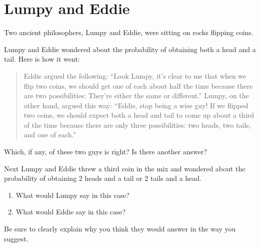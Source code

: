 \newpage
\section{Lumpy and Eddie}

Two ancient philosophers, Lumpy and Eddie, were sitting on rocks
flipping coins. 

\begin{prob} Lumpy and Eddie wondered about the probability of obtaining both a head and a tail. Here is how it went:
\begin{quote}
Eddie argued the following: ``Look Lumpy, it's clear to me that when
we flip two coins, we should get one of each about half the time
because there are two possibilities: They're either the same or
different.'' Lumpy, on the other hand, argued this way: ``Eddie, stop
being a wise guy! If we flipped two coins, we should expect both a
head and tail to come up about a third of the time because there are
only three possibilities: two heads, two tails, and one of each.''
\end{quote}
Which, if any, of these two guys is right?  Is there another answer?
\end{prob}

\begin{prob}
Next Lumpy and Eddie threw a third coin in the mix and wondered about
the probability of obtaining 2 heads and a tail or 2 tails and a head.
\begin{enumerate}
\item What would Lumpy say in this case?
\item What would Eddie say in this case?
\end{enumerate}
Be sure to clearly explain why you think they would answer in the way
you suggest.
\end{prob}

